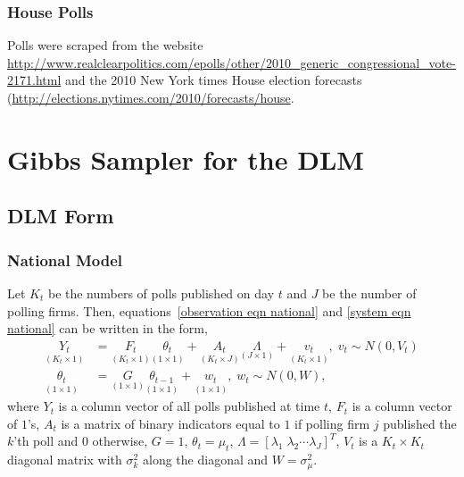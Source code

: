 \documentclass[12pt,final,fleqn]{article}
\theoremstyle{plain}
\begin{document}
\subsubsection{House Polls}
Polls were scraped from the website \url{http://www.realclearpolitics.com/epolls/other/2010_generic_congressional_vote-2171.html} and the 2010 New York times House election forecasts (\url{http://elections.nytimes.com/2010/forecasts/house}.

\section{Gibbs Sampler for the DLM} \label{sec: Gibbs}
\subsection{DLM Form} \label{sec: DLM Form}
\subsubsection{National Model} 
Let $K_t$ be the numbers of polls published on day $t$ and $J$ be the number of polling firms. Then, equations~\ref{observation eqn national} and \ref{system eqn national} can be written in the form,
\begin{align}
\label{eqn: dlm observation}
\underset{(K_t \times 1)}{Y_t} &= \underset{(K_t \times 1)}{F_t} \underset{(1 \times 1)}{\theta_t} + \underset{(K_t \times J)}{A_t} \underset{(J \times 1)}{\Lambda} + \underset{(K_t \times 1)}{v_t},\; v_t \sim N(0, V_t)\\
\label{eqn: dlm state}
\underset{(1 \times 1)}{\theta_t} &= \underset{(1 \times 1)}{G}\underset{(1 \times 1)}{\theta_{t-1}} + \underset{(1 \times 1)}{w_t},\; w_t \sim N(0, W),
\end{align}
where $Y_t$ is a column vector of all polls published at time $t$, $F_t$ is a column vector of $1$'s, $A_t$ is a matrix of binary indicators equal to $1$ if polling firm $j$ published the $k$'th poll and $0$ otherwise, $G=1$, $\theta_t = \mu_t$, $\Lambda =[\lambda_1\; \lambda_2\cdots \lambda_J]^T$,  $V_t$ is a $K_t \times K_t$ diagonal matrix with $\sigma^2_k$ along the diagonal and $W=\sigma^2_\mu$.
\end{document}

